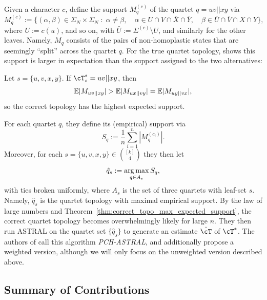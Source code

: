 \noindent Given a character $c$, define the support $M^{(c)}_q$ of the quartet $q = uv||xy$ via
%
\begin{equation*}
    M^{(c)}_{q}:= \Big\{(\alpha, \beta) \in \Sigma_N \times \Sigma_N \; : \; \alpha \neq \beta, \quad \alpha \in U \cap V \cap \bar{X} \cap \bar{Y}, \quad \beta \in \bar{U} \cap \bar{V} \cap X \cap Y\Big\},
\end{equation*}
%
where $U := c(u)$, and so on, with $\bar U:=\Sigma^{(c)}\setminus U$, and similarly for the other leaves. Namely, $M_q$ consists of the pairs of non-homoplastic states that are seemingly ``split'' across the quartet $q$.
For the true quartet topology, \cite[Theorem 1]{evans2026_canby_identifiability} shows this support is larger in expectation than the support assigned to
the two alternatives:
%
\begin{theorem}
\label{thm:correct_topo_max_expected_support}
    Let $s=\{u,v,x,y\}$. If $\cT_s^*=uv||xy$, then
    \[\mathbb{E} |M_{uv || xy}| > \mathbb{E} |M_{ux || vy}| = \mathbb{E} |M_{uy || vx}|,\]
    \noindent so the correct topology has the highest expected support.
\end{theorem}
%
\noindent For each quartet $q$, they define its (empirical) support via
%
\begin{equation}
    S_q := \frac{1}{n} \sum_{i=1}^n |M_q^{(c_i)}|.
    \label{eqn:quartet_support_averaged}
\end{equation}
%
\noindent Moreover, for each $s = \{u,v,x,y\} \in {[k] \choose 4}$ they then let
%
\begin{equation}
    \hat{q}_s := \operatorname*{arg\,max}_{q \in A_s} S_q,
    \label{eqn:astral_based_canby_inference_original}
\end{equation}
%
\noindent with ties broken uniformly, where $A_s$ is the set of three quartets with leaf-set $s$. Namely, $\hat{q}_s$ is the
quartet topology with maximal empirical support.
By the law of large numbers and Theorem~\ref{thm:correct_topo_max_expected_support}, the correct
quartet topology becomes overwhelmingly likely for large $n$. They then run ASTRAL on the quartet set $\{\hat{q}_s\}$
to generate an estimate $\hat{\cT}$ of $\cT^*$. The authors of \cite{evans2026_canby_identifiability} call this algorithm \textit{PCH-ASTRAL}, and
additionally propose a weighted version, although we will
only focus on the unweighted version described above.


\subsection{Summary of Contributions}

